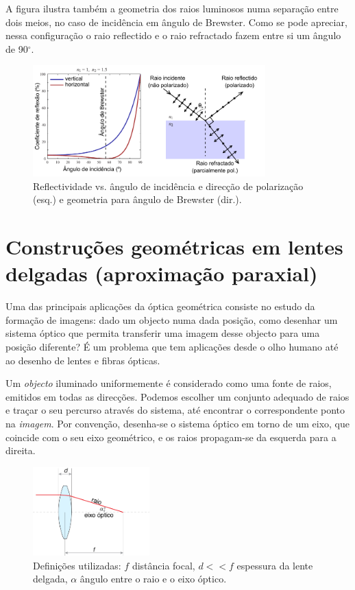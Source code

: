 \documentclass[a4paper,12pt]{article}      %
\begin{document}
A figura ilustra também a geometria dos raios luminosos numa separação entre dois meios, no caso de incidência em ângulo de Brewster. Como se pode apreciar, nessa configuração o raio reflectido e o raio refractado fazem entre si um ângulo de 90$^\circ$.

\begin{figure}
	[!hb]  \centering 
	\includegraphics[width=0.8\textwidth]{2-brewster}
	\caption{Reflectividade vs. ângulo de incidência e direcção de polarização (esq.) e geometria para ângulo de Brewster (dir.). \label{fig:brewster}} 
\end{figure}



\section{\sf Construções geométricas em lentes delgadas (aproximação paraxial)}

Uma das principais aplicações da óptica geométrica consiste no estudo da formação de imagens: dado um objecto numa dada posição, como desenhar um sistema óptico que permita transferir uma imagem desse objecto para uma posição diferente? É um problema que tem aplicações desde o olho humano até ao desenho de lentes e fibras ópticas.

 Um \emph{objecto} iluminado uniformemente é considerado como uma fonte de raios, emitidos em todas as direcções. Podemos escolher um conjunto adequado de raios e traçar o seu percurso através do sistema, até encontrar o correspondente ponto na \emph{imagem}. Por convenção, desenha-se o sistema óptico em torno de um eixo, que coincide com o seu eixo geométrico, e os raios propagam-se da esquerda para a direita. 

\begin{figure}
	[!hb]  \centering 
	\includegraphics[width=0.4\textwidth]{2-definicoes}
 	\caption{\label{fig:fig2} Definições utilizadas: $f$ distância focal, $d<<f$ espessura da lente delgada, $\alpha$ ângulo entre o raio e o eixo óptico.} 
\end{figure}
\end{document}
